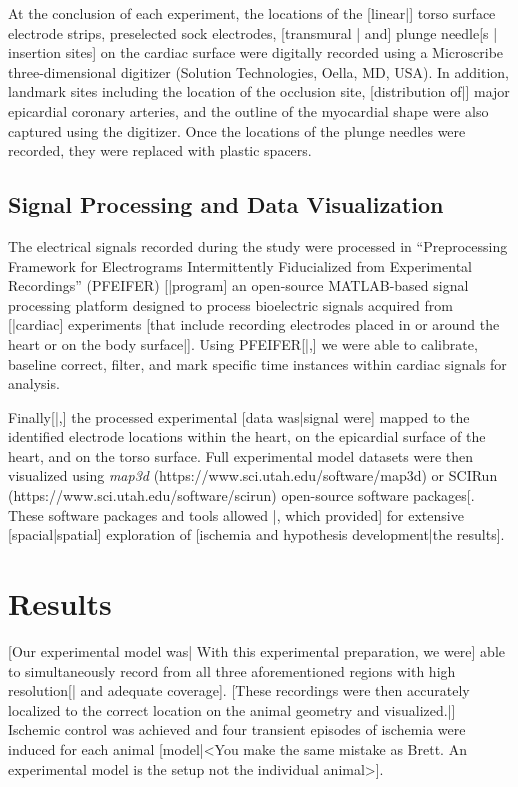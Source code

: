 \documentclass[twocolumn]{cinc}
\newcommand{\mapthreed}{\textit{map3d }}
\begin{document}

At the conclusion of each experiment, the locations of the [linear|] torso
surface electrode strips, preselected sock electrodes, [transmural | and]
plunge needle[s | insertion sites] on the cardiac surface were digitally
recorded using a Microscribe three-dimensional digitizer (Solution
Technologies, Oella, MD, USA). In addition, landmark sites including the
location of the occlusion site, [distribution of|] major epicardial
coronary arteries, and the outline of the myocardial shape were also
captured using the digitizer. Once the locations of the plunge needles were
recorded, they were replaced with plastic spacers.


\subsection{Signal Processing and Data Visualization}

The electrical signals recorded during the study were processed in
``Preprocessing Framework for Electrograms Intermittently Fiducialized from
Experimental Recordings'' (PFEIFER) [|program] an open-source MATLAB-based
signal processing platform designed to process bioelectric signals acquired
from [|cardiac] experiments [that include recording electrodes placed in or
around the heart or on the body surface|]. \cite{Rodenhauser2018} Using
PFEIFER[|,] we were able to calibrate, baseline correct, filter, and mark
specific time instances within cardiac signals for analysis.

Finally[|,] the processed experimental [data was|signal were] mapped to the
identified electrode locations within the heart, on the epicardial surface
of the heart, and on the torso surface. Full experimental model datasets
were then visualized using \mapthreed
(https://www.sci.utah.edu/software/map3d) or SCIRun
(https://www.sci.utah.edu/software/scirun) open-source software
packages[. These software packages and tools allowed |, which provided] for
extensive [spacial|spatial] exploration of [ischemia and hypothesis
development|the results].

\section{Results}

[Our experimental model was| With this experimental preparation, we were]
able to simultaneously record from all three aforementioned regions with
high resolution[| and adequate coverage]. [These recordings were then
accurately localized to the correct location on the animal geometry and
visualized.|] Ischemic control was achieved and four transient episodes of
ischemia were induced for each animal [model|<You make the same mistake as
Brett.  An experimental model is the setup not the individual animal>].
\end{document}
